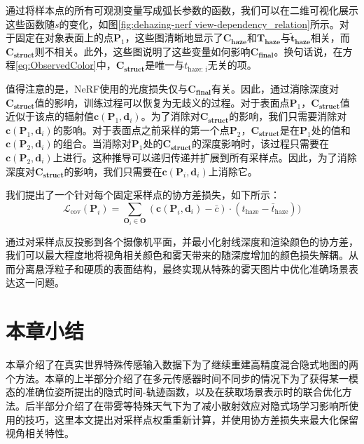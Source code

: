 通过将样本点的所有可观测变量写成弧长参数的函数，我们可以在二维可视化展示这些函数随$s$的变化，如图\ref{fig:dehazing-nerf view-dependency_relation}所示。对于固定在对象表面上的点$\mathbf{P}_1$，这些图清晰地显示了$\mathbf{C_\text{haze}}$和$\mathbf{T_\text{haze}}$与$\mathbf{\tilde{t}_\text{haze}}$相关，而$\mathbf{C_\text{struct}}$则不相关。此外，这些图说明了这些变量如何影响$\mathbf{C_\text{final}}$。换句话说，在方程\ref{eq:ObservedColor}中，$\mathbf{C_\text{struct}}$是唯一与${t}_\text{haze: i}$无关的项。

值得注意的是，NeRF使用的光度损失仅与$\mathbf{C_\text{final}}$有关。因此，通过消除深度对$\mathbf{C_\text{struct}}$值的影响，训练过程可以恢复为无歧义的过程。对于表面点$\mathbf{P}_1$，$\mathbf{C_\text{struct}}$值近似于该点的辐射值$\mathbf{c}(\mathbf{P}_1, \mathbf{d}_i)$。为了消除对$\mathbf{C_\text{struct}}$的影响，我们只需要消除对$\mathbf{c}(\mathbf{P}_1, \mathbf{d}_i)$的影响。对于表面点之前采样的第一个点$\mathbf{P}_2$，$\mathbf{C_\text{struct}}$是在$\mathbf{P}_1$处的值和$\mathbf{c}(\mathbf{P}_2, \mathbf{d}_i)$的组合。当消除对$\mathbf{P}_1$处的$\mathbf{C_\text{struct}}$的深度影响时，该过程只需要在$\mathbf{c}(\mathbf{P}_2, \mathbf{d}_i)$上进行。这种推导可以递归传递并扩展到所有采样点。因此，为了消除深度对$\mathbf{C_\text{struct}}$的影响，我们只需要在$\mathbf{c}(\mathbf{P}_i, \mathbf{d}_i)$上消除它。

我们提出了一个针对每个固定采样点的协方差损失，如下所示：
\begin{equation}
    \mathcal L_\text{cov}(\mathbf{P}_i) = \sum_{\mathbf{O}_i \in \mathbf{O}}(\mathbf{c}(\mathbf{P}_i, \mathbf{d}_i)-\bar{c})\cdot ({t}_\text{haze} - {\bar{t}}_\text{haze}))
\end{equation}

通过对采样点反投影到各个摄像机平面，并最小化射线深度和渲染颜色的协方差，我们可以最大程度地将视角相关颜色和雾天带来的随深度增加的颜色损失解耦。从而分离悬浮粒子和硬质的表面结构，最终实现从特殊的雾天图片中优化准确场景表达这一问题。

\section{本章小结}
本章介绍了在真实世界特殊传感输入数据下为了继续重建高精度混合隐式地图的两个方法。本章的上半部分介绍了在多元传感器时间不同步的情况下为了获得某一模态的准确位姿所提出的隐式时间-轨迹函数，以及在获取场景表示时的联合优化方法。后半部分介绍了在带雾等特殊天气下为了减小散射效应对隐式场学习影响所使用的技巧，这里本文提出对采样点权重重新计算，并使用协方差损失来最大化保留视角相关特性。